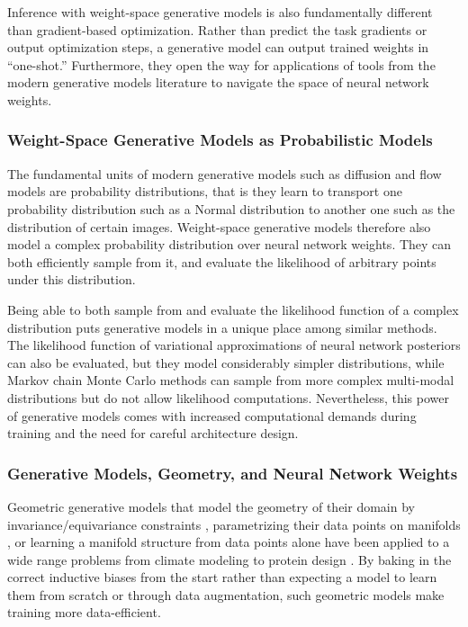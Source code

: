 Inference with weight-space generative models is also fundamentally different than gradient-based optimization. Rather than predict the task gradients or output optimization steps, a generative model can output trained weights in ``one-shot.'' Furthermore, they open the way for applications of tools from the modern generative models literature to navigate the space of neural network weights. 

\subsubsection*{Weight-Space Generative Models as Probabilistic Models}

The fundamental units of modern generative models such as diffusion and flow models are probability distributions, that is they learn to transport one probability distribution such as a Normal distribution to another one such as the distribution of certain images. Weight-space generative models therefore also model a complex probability distribution over neural network weights. They can both efficiently sample from it, and evaluate the likelihood of arbitrary points under this distribution. 

Being able to both sample from and evaluate the likelihood function of a complex distribution puts generative models in a unique place among similar methods. The likelihood function of variational approximations of neural network posteriors can also be evaluated, but they model considerably simpler distributions, while Markov chain Monte Carlo methods can sample from more complex multi-modal distributions but do not allow likelihood computations. Nevertheless, this power of generative models comes with increased computational demands during training and the need for careful architecture design. 


\subsubsection*{Generative Models, Geometry, and Neural Network Weights}

Geometric generative models that model the geometry of their domain by invariance/equivariance constraints \citep{kleinEquivariantFlowMatching2023a}, parametrizing their data points on manifolds \citep{chenRiemannianFlowMatching2023}, or learning a manifold structure from data points alone \citep{kapusniakMetricFlowMatching2024} have been applied to a wide range problems from climate modeling \citep{bodnarAuroraFoundationModel2024} to protein design \citep{boseSE3StochasticFlowMatching2024}. By baking in the correct inductive biases from the start rather than expecting a model to learn them from scratch or through data augmentation, such geometric models make training more data-efficient. 

